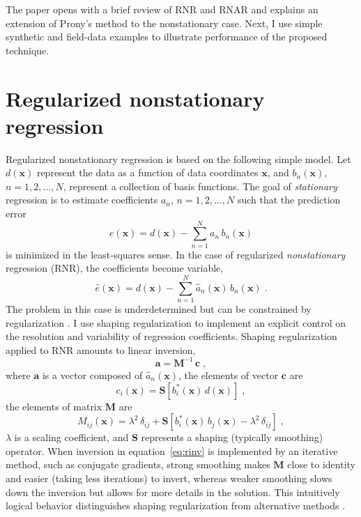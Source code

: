 The paper opens with a brief review of RNR and RNAR and explains an
extension of Prony's method to the nonstationary case. Next, I use
simple synthetic and field-data examples to illustrate performance of
the proposed technique.

\section{Regularized nonstationary regression}

Regularized nonstationary regression \cite[]{lpf} is based on the
following simple model. Let $d(\mathbf{x})$ represent the data as a
function of data coordinates $\mathbf{x}$, and $b_n(\mathbf{x})$,
$n=1,2,\ldots,N$, represent a collection of basis functions. The goal
of \emph{stationary} regression is to estimate coefficients $a_n$,
$n=1,2,\ldots,N$ such that the prediction error
\begin{equation}
  \label{eq:pred}
  e(\mathbf{x}) = d(\mathbf{x}) - \sum_{n=1}^{N} a_n\,b_n(\mathbf{x})
\end{equation}
is minimized in the least-squares sense. In the case of regularized
\emph{nonstationary} regression (RNR), the coefficients become
variable, 
\begin{equation}
  \label{eq:predhat}
  \hat{e}(\mathbf{x}) = d(\mathbf{x}) - \sum_{n=1}^{N} \hat{a}_n(\mathbf{x})\,b_n(\mathbf{x})\;.
\end{equation}
The problem in this case is underdetermined but can be constrained by regularization \cite[]{engl}. I use
shaping
regularization \cite[]{shape} to implement an explicit control on the resolution and variability of regression coefficients.
Shaping regularization applied to RNR
amounts to linear inversion,
\begin{equation}
  \label{eq:rinv}
  \mathbf{a} = \mathbf{M}^{-1}\,\mathbf{c}\;,
\end{equation}
where $\mathbf{a}$ is a vector composed of $\hat{a}_n(\mathbf{x})$,
the elements of vector $\mathbf{c}$ are
\begin{equation}
  \label{eq:cj}
c_i(\mathbf{x}) = \mathbf{S}\left[b_i^{*}(\mathbf{x})\,d(\mathbf{x})\right]\;,
\end{equation}
the elements of matrix $\mathbf{M}$ are
\begin{equation}
  \label{eq:raij}
  M_{ij}(\mathbf{x}) = \lambda^2\,\delta_{ij} + 
  \mathbf{S}\left[b_i^{*}(\mathbf{x})\,b_j(\mathbf{x}) - 
    \lambda^2\,\delta_{ij}\right]\;,
\end{equation}
$\lambda$ is a scaling coefficient, and $\mathbf{S}$ represents a
shaping (typically smoothing) operator. When inversion in
equation~\ref{eq:rinv} is implemented by an iterative method, such
as conjugate gradients, strong smoothing makes
$\mathbf{M}$ close to identity and easier (taking less iterations) to
invert, whereas weaker smoothing slows down the inversion but allows for
more details in the solution. This intuitively logical behavior
distinguishes shaping regularization from alternative methods \cite[]{lpf}.

